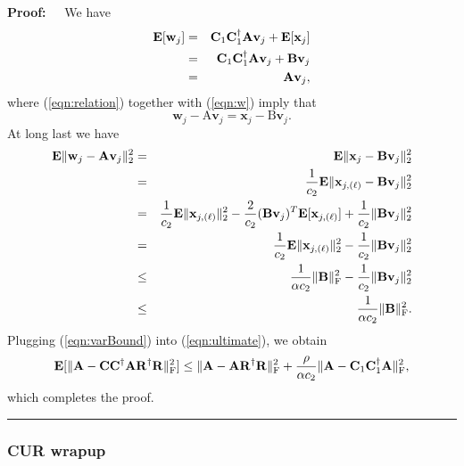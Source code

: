 \documentclass[11pt]{article}
\newcommand{\FNormS}[1]{\mbox{}\|#1\|_\mathrm{F}^2}
\newenvironment{proof}{\begin{trivlist} \item {\bf Proof:~~}}
  {\qed\end{trivlist}}
\newcommand{\mat}[1]{{\ensuremath{\bm{\mathrm{#1}}}}}
\def\ve{{\mathbf v}}
\def\matA{\mat{A}}
\def\matB{\mat{B}}
\def\matC{\mat{C}}
\def\matR{\mat{R}}
\def\w{{\mathbf{w}}}
\def\frac#1#2{{#1\over #2}}
\def\qed{\hfill\rule{2mm}{2mm}}
\def\x{{\mathbf x}}
\begin{document}
\begin{proof}
We have
\begin{eqnarray}\label{eqn:relation}
{\bf E}[\w_j] & = & \matC_1\matC_1^{\dagger} \matA\ve_j + {\bf E}[\x_j] \notag \\
& = & \matC_1 \matC_1^{\dagger}\matA\ve_j + \matB\ve_j \notag \\
& = & \matA\ve_j, 
\end{eqnarray}
where (\ref{eqn:relation}) together with (\ref{eqn:w}) imply that
$$\w_j - \matA\ve_j = \x_j - \matB\ve_j.$$
At long last we have
\begin{eqnarray}\label{eqn:varBound}
{\bf E}\|\w_j - \matA\ve_j\|_2^2 & = & {\bf E}\|\x_j - \matB\ve_j\|_2^2 \notag \\
& = & \frac{1}{c_2} {\bf E}\|\x_{j, (\ell)}-\matB\ve_j\|_2^2 \notag \\
& = & \frac{1}{c_2} {\bf E}\|\x_{j, (\ell)}\|_2^2 - \frac{2}{c_2}(\matB\ve_j)^T {\bf E}[\x_{j, (\ell)}] + \frac{1}{c_2} \|\matB\ve_j\|_2^2\notag \\
& = & \frac{1}{c_2} {\bf E}\|\x_{j, (\ell)}\|_2^2 - \frac{1}{c_2} \|\matB\ve_j\|_2^2 \notag \\
& \leq & \frac{1}{\alpha c_2} \FNormS{\matB} - \frac{1}{c_2} \|\matB\ve_j\|_2^2 \notag \\
& \leq & \frac{1}{\alpha c_2} \FNormS{\matB}.
\end{eqnarray}
Plugging (\ref{eqn:varBound}) into (\ref{eqn:ultimate}), we obtain
$${\bf E}[\FNormS{\matA-\matC\matC^{\dagger}\matA\matR^{\dagger} \matR}] \leq 
\FNormS{\matA-\matA\matR^{\dagger}\matR} + \frac{\rho}{\alpha c_2} \FNormS{\matA-\matC_1 \matC_1^{\dagger}\matA},$$
which completes the proof. 
\end{proof}

\subsubsection{CUR wrapup}\label{sec:CURWrapup}
\end{document}
